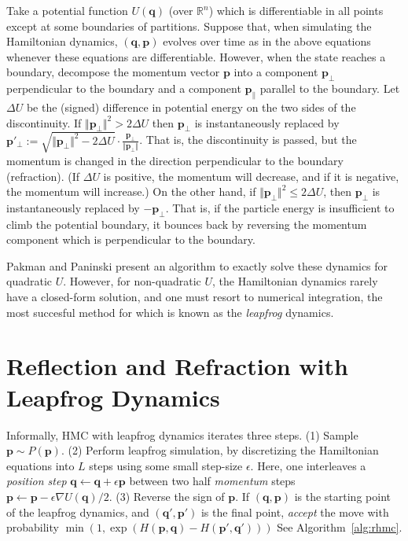 \documentclass{article} %
\newcommand{\bvec}[1]{\textbf{#1}}
\begin{document}
Take a potential function $U(\bvec{q})$ (over $\mathbb{R}^n$) which is differentiable in all points except at some boundaries of partitions.  Suppose that, when simulating the Hamiltonian dynamics, $(\bvec{q}, \bvec{p})$ evolves over time as in the above equations whenever these equations are differentiable.  However, when the state reaches a boundary, decompose the momentum vector $\bvec{p}$ into a component $\bvec{p}_\perp$ perpendicular to the boundary and a component $\bvec{p}_\parallel$ parallel to the boundary.  
Let $\Delta U$ be the (signed) difference in potential energy on the two sides of the discontinuity.   If $\Vert \bvec{p}_\perp \Vert^2 > 2\Delta U$ then $\bvec{p}_\perp$ is instantaneously replaced by $\bvec{p}'_\perp := \sqrt{ \Vert \bvec{p}_\perp \Vert^2 - 2 \Delta U} \cdot \frac{\bvec{p}_\perp}{\Vert \bvec{p}_\perp \Vert}$. 
That is, the discontinuity is passed, but the momentum is changed in the direction perpendicular to the boundary (refraction).  (If $\Delta U$ is positive, the momentum will decrease, and if it is negative, the momentum will increase.)  On the other hand, if $\Vert \bvec{p}_\perp \Vert^2 \leq 2\Delta U$, then $\bvec{p}_\perp$ is instantaneously replaced by $-\bvec{p}_\perp$.  That is, if the particle energy is insufficient to climb the potential boundary, it bounces back by reversing the momentum component which is perpendicular to the boundary.

Pakman and Paninski \cite{pakman2014exact, pakman2013auxiliary} present an algorithm to exactly solve these dynamics for quadratic $U$.  However, for non-quadratic $U$, the Hamiltonian dynamics rarely have a closed-form solution, and one must resort to numerical integration, the most succesful method for which is known as the \emph{leapfrog} dynamics.




\section{Reflection and Refraction with Leapfrog Dynamics}

Informally, HMC with leapfrog dynamics iterates three steps. (1) Sample $\bvec{p} \sim P(\bvec{p})$. (2) Perform leapfrog simulation, by discretizing the Hamiltonian equations into $L$ steps using some small step-size $\epsilon$.  Here, one interleaves a \emph{position step} 
$\bvec{q} \leftarrow \bvec{q} + \epsilon \bvec{p}$ 
between two half \emph{momentum} steps $\bvec{p} \leftarrow \bvec{p} - \epsilon \nabla U(\bvec{q})/2.$ (3) Reverse the sign of $\bvec{p}$. If $(\bvec{q},\bvec{p})$ is the starting point of the leapfrog dynamics, and $(\bvec{q}', \bvec{p}')$ is the final point, \emph{accept} the move with probability $\min(1,\exp(H(\bvec{p},\bvec{q})-H(\bvec{p}', \bvec{q}')))$  See Algorithm~\ref{alg:rhmc}.
\end{document}
